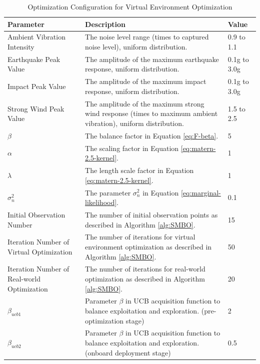 \documentclass[a4paper,fleqn,numbers,sort&compress]{cas-sc}
\begin{document}
\begin{table}[h!]
    \centering
    \caption{Optimization Configuration for Virtual Environment Optimization}
    \label{tab:optimization-configuration}
    \renewcommand{\arraystretch}{1.5}
    {\selectfont %
    \small
    \begin{tabular}{|p{}|p{}|p{}|}
    \hline
    \textbf{Parameter}  & \textbf{Description}  & \textbf{Value}  \\ \hline
    Ambient Vibration Intensity & The noise level range (times to captured noise level), uniform distribution. & 0.9 to 1.1 \\ \hline
    Earthquake Peak Value & The amplitude of the maximum earthquake response, uniform distribution. & 0.1g to 3.0g \\ \hline
    Impact Peak Value & The amplitude of the maximum impact response, uniform distribution. & 0.1g to 3.0g \\ \hline
    Strong Wind Peak Value & The amplitude of the maximum strong wind response (times to maximum ambient vibration), uniform distribution. & 1.5 to 2.5 \\ \hline
    $\beta$ & The balance factor in Equation \ref{eq:F-beta}. & 5 \\ \hline
    $\alpha$ & The scaling factor in Equation \ref{eq:matern-2.5-kernel}. & 1 \\ \hline
    $\lambda$ & The length scale factor in Equation \ref{eq:matern-2.5-kernel}. & 1 \\ \hline
    $\sigma_n^2$ & The parameter $\sigma_n^2$ in Equation \ref{eq:marginal-likelihood}. & 0.1 \\ \hline
    Initial Observation Number & The number of initial observation points as described in Algorithm \ref{alg:SMBO}. & 15 \\ \hline
    Iteration Number of Virtual Optimization & The number of iterations for virtual environment optimization as described in Algorithm \ref{alg:SMBO}. & 50 \\ \hline
    Iteration Number of Real-world Optimization & The number of iterations for real-world optimization as described in Algorithm \ref{alg:SMBO}. & 20 \\ \hline
    $\beta_{ucb1}$ & Parameter $\beta$ in UCB acquisition function to balance exploitation and exploration. (pre-optimization stage) & 2 \\ \hline
    $\beta_{ucb2}$ & Parameter $\beta$ in UCB acquisition function to balance exploitation and exploration. (onboard deployment stage) & 0.5 \\ \hline

\end{tabular}}
\end{table}
\end{document}
